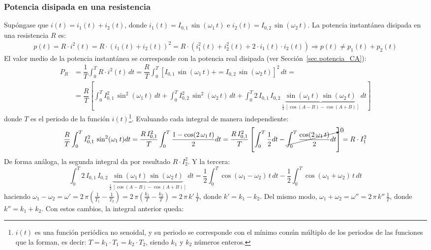 \documentclass[11pt]{book} %
\begin{document}
	\subsubsection{Potencia disipada en una resistencia}
Supóngase que $i(t) = i_1(t) + i_2(t)$, donde $i_1(t)=I_{0,1}\,\sin(\omega_1\,t)$ e $i_2(t)=I_{0,2}\,\sin(\omega_2\,t)$. La potencia instantánea disipada en una resistencia $R$ es:
\begin{align*}
  p(t) = R \cdot i^2(t) = R \cdot (i_1(t) + i_2(t))^2 =R \cdot (i_1^2(t) + i_2^2(t) + 2\cdot i_1(t) \cdot i_2(t))\Rightarrow p(t) \neq p_1(t) + p_2(t)
\end{align*} 
El valor medio de la potencia instantánea se corresponde con la potencia real disipada (ver Sección~\ref{sec.potencia_CA}):
\begin{align*}
    P_R&=\dfrac{1}{T}\int_0^{T}R\cdot i^2(t)\,dt=\dfrac{R}{T}\int_0^T\left[ I_{0,1}\,\sin(\omega_1\,t)+=I_{0,2}\,\sin(\omega_2\,t)\right]^2\,dt=\\
    & = \dfrac{R}{T}\left[ \int_0^T I_{0,1}^2\,\sin^2(\omega_1\,t)\,dt + \int_0^T I_{0,2}^2\,\sin^2(\omega_2\,t)\,dt + 
    \int_0^T 2\,I_{0,1}\, I_{0,2}\,\underbrace{\sin(\omega_1\,t)\,\sin(\omega_2\,t)}_{\frac{1}{2}\,\left[\cos(A-B)-\cos(A+B)\right]}\,dt \right]
\end{align*}
donde $T$ es el periodo de la función $i(t)$\footnote{$i(t)$ es una función periódica no senoidal, y su periodo se corresponde con el mínimo común múltiplo de los periodos de las funciones que la forman, es decir: $T=k_1\cdot T_1=k_2\cdot T_2$, siendo $k_1$ y $k_2$ números enteros.}. Evaluando cada integral de manera independiente:
\begin{equation*}
    \dfrac{R}{T} \int_0^T I_{0,1}^2\,\sin^2(\omega_1\,t)dt=\dfrac{R\,I_{0,1}^2}{T}\int_0^T\dfrac{1-\cos(2\,\omega_1\,t)}{2}dt=\dfrac{R\,I_{0,1}^2}{T}\left[\int_0^T\dfrac{1}{2}dt-\cancelto{0}{\int_0^T \dfrac{\cos(2\,\omega_1\,t)}{2}dt}\right]=R\cdot I_1^2
\end{equation*}
De forma análoga, la segunda integral da por resultado $R\cdot I_2^2$. Y la tercera:
\begin{equation*}
    \int_0^T 2\,I_{0,1}\, I_{0,2}\,\underbrace{\sin(\omega_1\,t)\,\sin(\omega_2\,t)}_{\frac{1}{2}\,\left[\cos(A-B)-\cos(A+B)\right]}\,dt=\dfrac{1}{2}\int_0^T\cos(\omega_1-\omega_2)\,t\,dt-\dfrac{1}{2}\int_0^T\cos(\omega_1+\omega_2)\,t\,dt
\end{equation*}
haciendo $\omega_1-\omega_2=\omega'=2\,\pi\left(\frac{1}{T_1}-\frac{1}{T_2} \right)=2\,\pi\left(\frac{k_1}{T}-\frac{k_2}{T}\right)=2\,\pi\,k'\,\frac{1}{T}$, donde $k'=k_1-k_2$. Del mismo modo, $\omega_1+\omega_2=\omega''=2\,\pi\,k''\,\frac{1}{T}$, donde $k''=k_1+k_2$. Con estos cambios, la integral anterior queda:
\end{document}
